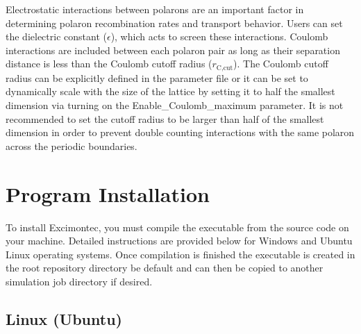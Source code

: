 \documentclass[%
 reprint,onecolumn,notitlepage,
superscriptaddress,longbibliography,
 amsmath,amssymb,
 aps,rmp,floatfix,
]{revtex4-1}
\begin{document}
Electrostatic interactions between polarons are an important factor in determining polaron recombination rates\cite{heiber2016prb} and transport behavior\cite{vanderholst2011prb}.
Users can set the dielectric constant ($\epsilon$), which acts to screen these interactions.
Coulomb interactions are included between each polaron pair as long as their separation distance is less than the Coulomb cutoff radius ($r_{\text{C,cut}}$).
The Coulomb cutoff radius can be explicitly defined in the parameter file or it can be set to dynamically scale with the size of the lattice by setting it to half the smallest dimension via turning on the Enable\_Coulomb\_maximum parameter.
It is not recommended to set the cutoff radius to be larger than half of the smallest dimension in order to prevent double counting interactions with the same polaron across the periodic boundaries.

\section{Program Installation}

To install Excimontec, you must compile the executable from the source code on your machine.
Detailed instructions are provided below for Windows and Ubuntu Linux operating systems.
Once compilation is finished the executable is created in the root repository directory be default and can then be copied to another simulation job directory if desired.

\subsection{Linux (Ubuntu)}
\end{document}
